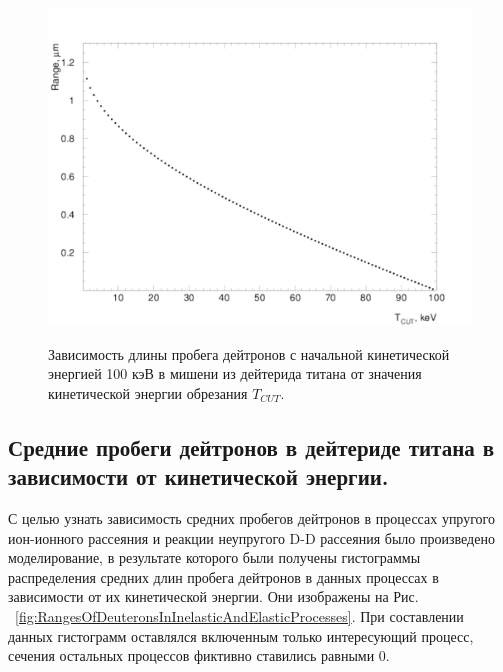 \documentclass[a4paper,12pt]{article}
\begin{document}
\begin{large}
\begin{figure}[ht]
  {
     \includegraphics[width=0.99\linewidth]{images/ranges.pdf}
  }
  \caption{Зависимость длины пробега дейтронов с начальной кинетической энергией 100 кэВ в мишени из дейтерида титана от значения кинетической энергии обрезания $T_{CUT}$.}
  \label{fig:RangesOfDeuteronsInTiD2}
\end{figure}

\subsection{Средние пробеги дейтронов в дейтериде титана в зависимости от кинетической энергии.}
\label{DeuteronMeanRangesDependenceOnEnergyInTiD2}

	С целью узнать зависимость средних пробегов дейтронов в процессах упругого ион-ионного рассеяния и реакции неупругого D-D рассеяния было произведено моделирование, в результате которого были получены гистограммы распределения средних длин пробега дейтронов в данных процессах в зависимости от их кинетической энергии.
	Они изображены на Рис. ~\ref{fig:RangesOfDeuteronsInInelasticAndElasticProcesses}.
	При составлении данных гистограмм оставлялся включенным только интересующий процесс, сечения остальных процессов фиктивно ставились равными 0.  
	

\end{large}
\end{document}
